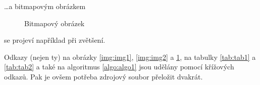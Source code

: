 \documentclass[11pt, a4paper, titlepage]{article}
\begin{document}
\noindent\dots a bitmapovým obrázkem
\begin{figure}[h]
\centering
{} 
\caption{Bitmapový obrázek} \label{pic:3}
\label{img:img3}
\end{figure} 
\bigskip

\noindent se projeví například při zvětšení.

Odkazy (nejen ty) na obrázky \ref*{img:img1}, \ref*{img:img2} a \ref*{img:img3}, na tabulky \ref*{tab:tab1} a \ref*{tab:tab2} a také na algoritmus \ref*{algo:algo1} jsou udělány pomocí křížových odkazů. Pak je ovšem potřeba zdrojový soubor přeložit dvakrát.
\end{document}
